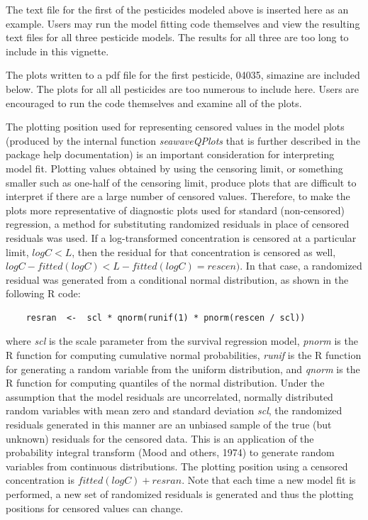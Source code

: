 \documentclass[11pt]{article}
\begin{document}
The text file for the first of the pesticides modeled above is inserted here as an example.  Users may run the model fitting code themselves and view the resulting text files for all three pesticide models.  The results for all three are too long to include in this vignette.

\vspace{5 mm}

%

\vspace{5 mm}

The plots written to a pdf file for the first pesticide, 04035, simazine are included below.  The plots for all  all pesticides are too numerous to include here.  Users are encouraged to run the code themselves and examine all of the plots.



\vspace{5 mm}

The plotting position used for representing censored values in the model plots (produced by the internal function \textit{seawaveQPlots} that is further described in the package help documentation) is an important consideration for interpreting model fit.  Plotting values obtained by using the censoring limit, or something smaller such as one-half of the censoring limit, produce plots that are difficult to interpret if there are a large number of censored values.  Therefore, to make the plots more representative of diagnostic plots used for standard (non-censored) regression,  a method for substituting randomized residuals in place of censored residuals was used.   If a log-transformed concentration is censored at a particular limit, $logC < L$, then the residual for that concentration is censored as well, $logC - fitted(logC) < L - fitted(logC) = rescen)$.  In that case, a randomized residual was generated from a conditional normal distribution, as shown in the following R code:
\begin{verbatim}
	resran  <-  scl * qnorm(runif(1) * pnorm(rescen / scl))
\end{verbatim}
where \textit{scl} is the scale parameter from the survival regression model, \textit{pnorm} is the R function for computing cumulative normal probabilities, \textit{runif} is the R function for generating a random variable from the uniform distribution, and \textit{qnorm} is the R function for computing quantiles of the normal distribution.  Under the assumption that the model residuals are uncorrelated, normally distributed random variables with mean zero and standard deviation \textit{scl}, the randomized residuals generated in this manner are an unbiased sample of the true (but unknown) residuals for the censored data.  This is an application of the probability integral transform (Mood and others, 1974) to generate random variables from continuous distributions.  The plotting position using a censored concentration is $fitted(logC) + resran$.  Note that each time a new model fit is performed, a new set of randomized residuals is generated and thus the plotting positions for censored values can change.
\end{document}
